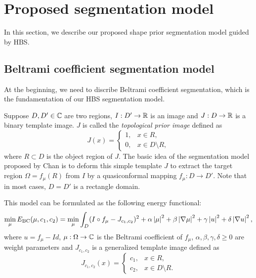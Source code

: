 \documentclass[review,onefignum,onetabnum]{siamonline190516}
\begin{document}

\section{Proposed segmentation model}\label{main}
In this section, we describe our proposed shape prior segmentation model guided by HBS.

\subsection{Beltrami coefficient segmentation model}
At the beginning, we need to discribe Beltrami coefficient segmentation, which is the fundamentation of our HBS segmentation model. 

Suppose $D, D' \in \mathbb{C}$ are two regions, $I: D' \rightarrow \mathbb{R}$ is an image and $J: D \rightarrow \mathbb{R}$ is a binary template image. $J$ is called the \textit{topological prior image} defined as
\begin{equation}
    J(x) = \begin{cases}
        1, & x \in R,              \\
        0, & x \in D \setminus R,
    \end{cases}
\end{equation}
where $R \subset D$ is the object region of $J$. The basic idea of the segmentation model proposed by Chan \etal \cite{} is to deform this simple template $J$ to extract the target region $\Omega = f_\mu(R)$ from $I$ by a quasiconformal mapping $f_\mu: D \rightarrow D'$. Note that in most cases, $D = D'$ is a rectangle domain.

This model can be formulated as the following energy functional:
\begin{equation}\label{bc seg model}
    \min_{\mu} E_{\text{BC}}(\mu, c_1, c_2) = \min_{\mu} \int_D (I \circ f_\mu - J_{c_1,c_2})^2 + \alpha \abs{\mu}^2 + \beta \abs{\nabla \mu}^2 + \gamma \abs{u}^2 + \delta \abs{\nabla u}^2,
\end{equation}
where $u = f_\mu - Id$, $\mu: \Omega \rightarrow \mathbb{C}$ is the Beltrami coefficient of $f_\mu$,  $\alpha, \beta, \gamma, \delta \ge 0$ are weight parameters and $J_{c_1, c_2}$ is a generalized template image defined as
\begin{equation}
    J_{c_1, c_2}(x) = \begin{cases}
        c_1, & x \in R,              \\
        c_2, & x \in D \setminus R.
    \end{cases}
\end{equation}
\end{document}
